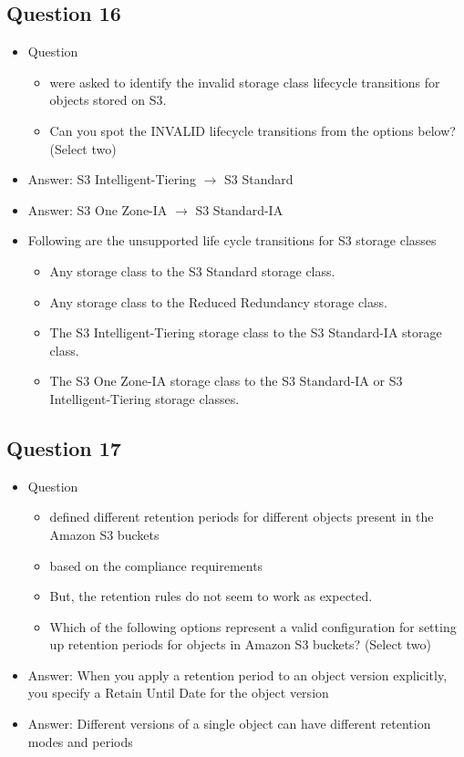 \documentclass[]{scrartcl}
\begin{document}
\subsection{Question 16}
\begin{itemize}
	\item Question
	\begin{itemize}
		\item were asked to identify the invalid storage class lifecycle transitions for objects stored on S3.
		\item Can you spot the INVALID lifecycle transitions from the options below? (Select two)
	\end{itemize}
	\item Answer: S3 Intelligent-Tiering $\rightarrow$ S3 Standard
	\item Answer: S3 One Zone-IA $\rightarrow$ S3 Standard-IA
	\item Following are the unsupported life cycle transitions for S3 storage classes
	\begin{itemize}
		\item Any storage class to the S3 Standard storage class. 
		\item Any storage class to the Reduced Redundancy storage class. 
		\item The S3 Intelligent-Tiering storage class to the S3 Standard-IA storage class. 
		\item The S3 One Zone-IA storage class to the S3 Standard-IA or S3 Intelligent-Tiering storage classes.
	\end{itemize}
\end{itemize}

\subsection{Question 17}
\begin{itemize}
	\item Question
	\begin{itemize}
		\item defined different retention periods for different objects present in the Amazon S3 buckets
		\item based on the compliance requirements
		\item But, the retention rules do not seem to work as expected.
		\item Which of the following options represent a valid configuration for setting up retention periods for objects in Amazon S3 buckets? (Select two)
	\end{itemize}
	\item Answer: When you apply a retention period to an object version explicitly, you specify a Retain Until Date for the object version
	\item Answer: Different versions of a single object can have different retention modes and periods 
\end{itemize}
\end{document}
